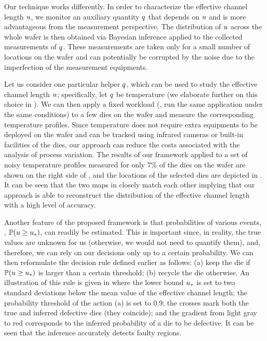 Our technique works differently.
In order to characterize the effective channel length $u$, we monitor an auxiliary quantity $q$ that depends on $u$ and is more advantageous from the measurement perspective.
The distribution of $u$ across the whole wafer is then obtained via Bayesian inference \cite{gelman2004} applied to the collected measurements of $q$.
These measurements are taken only for a small number of locations on the wafer and can potentially be corrupted by the noise due to the imperfection of the measurement equipments.

Let us consider one particular helper $q$, which can be used to study the effective channel length $u$; specifically, let $q$ be temperature (we elaborate further on this choice in ).
We can then apply a fixed workload (\eg, run the same application under the same conditions) to a few dies on the wafer and measure the corresponding temperature profiles.
Since temperature does not require extra equipments to be deployed on the wafer and can be tracked using infrared cameras \cite{mesa-martinez2007} or built-in facilities of the dies, our approach can reduce the costs associated with the analysis of process variation.
The results of our framework applied to a set of noisy temperature profiles measured for only 7\% of the dies on the wafer are shown on the right side of , and the locations of the selected dies are depicted in .
It can be seen that the two maps in  closely match each other implying that our approach is able to reconstruct the distribution of the effective channel length with a high level of accuracy.

Another feature of the proposed framework is that probabilities of various events, \eg, $\mathbb{P}(u \geq u_*)$, can readily be estimated.
This is important since, in reality, the true values are unknown for us (otherwise, we would not need to quantify them), and, therefore, we can rely on our decisions only up to a certain probability.
We can then reformulate the decision rule defined earlier as follows: (a) keep the die if $\mathbb{P}(u \geq u_*)$ is larger than a certain threshold; (b) recycle the die otherwise.
An illustration of this rule is given in  where the lower bound $u_*$ is set to two standard deviations below the mean value of the effective channel length; the probability threshold of the action (a) is set to 0.9; the crosses mark both the true and inferred defective dies (they coincide); and the gradient from light gray to red corresponds to the inferred probability of a die to be defective. It can be seen that the inference accurately detects faulty regions.


